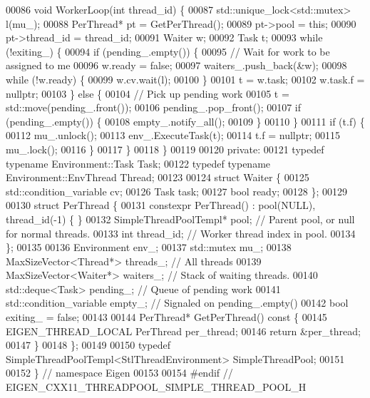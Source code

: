 \begin{DoxyCode}
00086   \textcolor{keywordtype}{void} WorkerLoop(\textcolor{keywordtype}{int} thread\_id) \{
00087     std::unique\_lock<std::mutex> l(mu\_);
00088     PerThread* pt = GetPerThread();
00089     pt->pool = \textcolor{keyword}{this};
00090     pt->thread\_id = thread\_id;
00091     Waiter w;
00092     Task t;
00093     \textcolor{keywordflow}{while} (!exiting\_) \{
00094       \textcolor{keywordflow}{if} (pending\_.empty()) \{
00095         \textcolor{comment}{// Wait for work to be assigned to me}
00096         w.ready = \textcolor{keyword}{false};
00097         waiters\_.push\_back(&w);
00098         \textcolor{keywordflow}{while} (!w.ready) \{
00099           w.cv.wait(l);
00100         \}
00101         t = w.task;
00102         w.task.f = \textcolor{keyword}{nullptr};
00103       \} \textcolor{keywordflow}{else} \{
00104         \textcolor{comment}{// Pick up pending work}
00105         t = std::move(pending\_.front());
00106         pending\_.pop\_front();
00107         \textcolor{keywordflow}{if} (pending\_.empty()) \{
00108           empty\_.notify\_all();
00109         \}
00110       \}
00111       \textcolor{keywordflow}{if} (t.f) \{
00112         mu\_.unlock();
00113         env\_.ExecuteTask(t);
00114         t.f = \textcolor{keyword}{nullptr};
00115         mu\_.lock();
00116       \}
00117     \}
00118   \}
00119 
00120  \textcolor{keyword}{private}:
00121   \textcolor{keyword}{typedef} \textcolor{keyword}{typename} Environment::Task Task;
00122   \textcolor{keyword}{typedef} \textcolor{keyword}{typename} Environment::EnvThread Thread;
00123 
00124   \textcolor{keyword}{struct }Waiter \{
00125     std::condition\_variable cv;
00126     Task task;
00127     \textcolor{keywordtype}{bool} ready;
00128   \};
00129 
00130   \textcolor{keyword}{struct }PerThread \{
00131     constexpr PerThread() : pool(NULL), thread\_id(-1) \{ \}
00132     SimpleThreadPoolTempl* pool;  \textcolor{comment}{// Parent pool, or null for normal threads.}
00133     \textcolor{keywordtype}{int} thread\_id;                \textcolor{comment}{// Worker thread index in pool.}
00134   \};
00135 
00136   Environment env\_;
00137   std::mutex mu\_;
00138   MaxSizeVector<Thread*> threads\_;  \textcolor{comment}{// All threads}
00139   MaxSizeVector<Waiter*> waiters\_;  \textcolor{comment}{// Stack of waiting threads.}
00140   std::deque<Task> pending\_;        \textcolor{comment}{// Queue of pending work}
00141   std::condition\_variable empty\_;   \textcolor{comment}{// Signaled on pending\_.empty()}
00142   \textcolor{keywordtype}{bool} exiting\_ = \textcolor{keyword}{false};
00143 
00144   PerThread* GetPerThread()\textcolor{keyword}{ const }\{
00145     EIGEN\_THREAD\_LOCAL PerThread per\_thread;
00146     \textcolor{keywordflow}{return} &per\_thread;
00147   \}
00148 \};
00149 
00150 \textcolor{keyword}{typedef} SimpleThreadPoolTempl<StlThreadEnvironment> SimpleThreadPool;
00151 
00152 \}  \textcolor{comment}{// namespace Eigen}
00153 
00154 \textcolor{preprocessor}{#endif  // EIGEN\_CXX11\_THREADPOOL\_SIMPLE\_THREAD\_POOL\_H}
\end{DoxyCode}
